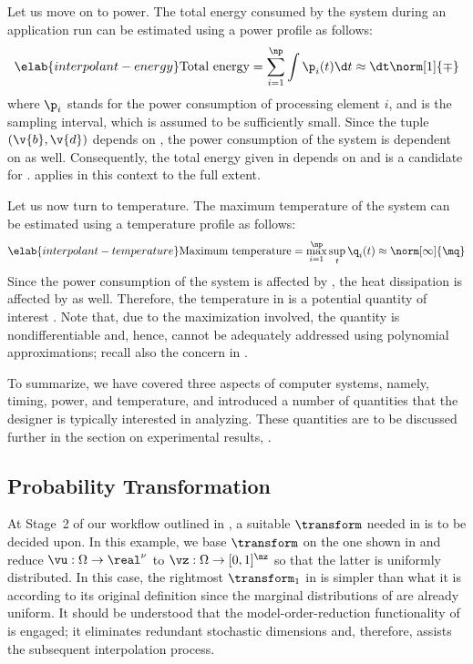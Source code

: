 Let us move on to power. The total energy consumed by the system during an
application run can be estimated using a power profile \mp as follows:
\begin{equation} \elab{interpolant-energy}
  \text{Total energy}
  = \sum_{i = 1}^\np \int \p_i(t) \d t
  \approx \dt \norm[1]{\mp}
\end{equation}
where $\p_i$ stands for the power consumption of processing element $i$, and \dt
is the sampling interval, which is assumed to be sufficiently small. Since the
tuple $(\v{b}, \v{d})$ depends on \vu, the power consumption of the system is
dependent on \vu as well. Consequently, the total energy given in
 depends on \vu and is a candidate for \g.
 applies in this context to the full extent.

Let us now turn to temperature. The maximum temperature of the system can be
estimated using a temperature profile \mq as follows:
\begin{equation} \elab{interpolant-temperature}
  \text{Maximum temperature}
  = \max_{i = 1}^\np \sup_{t} \q_i(t)
  \approx \norm[\infty]{\mq}
\end{equation}
Since the power consumption of the system is affected by \vu, the heat
dissipation is affected by \vu as well. Therefore, the temperature in
 is a potential quantity of interest \g. Note
that, due to the maximization involved, the quantity is nondifferentiable and,
hence, cannot be adequately addressed using polynomial approximations; recall
also the concern in .

To summarize, we have covered three aspects of computer systems, namely, timing,
power, and temperature, and introduced a number of quantities that the designer
is typically interested in analyzing. These quantities are to be discussed
further in the section on experimental results, .

\subsection{Probability Transformation}

At Stage~2 of our workflow outlined in , a suitable
$\transform$ needed in  is to be decided upon.
In this example, we base $\transform$ on the one shown in
 and reduce $\vu: \Omega \to \real^\nu$ to
$\vz: \Omega \to [0, 1]^\nz$ so that the latter is uniformly distributed. In
this case, the rightmost $\transform_1$ in  is
simpler than what it is according to its original definition since the marginal
distributions of \vz are already uniform. It should be understood that the
model-order-reduction functionality of  is
engaged; it eliminates redundant stochastic dimensions and, therefore, assists
the subsequent interpolation process.

